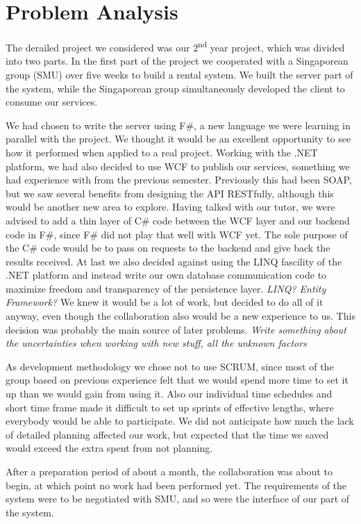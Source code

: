 \section{Problem Analysis}
The derailed project we considered was our 2\textsuperscript{nd} year project, which was divided into two parts. In the first part of the project we cooperated with a Singaporean group (SMU) over five weeks to build a rental system. We built the server part of the system, while the Singaporean group simultaneously developed the client to consume our services.

We had chosen to write the server using F\#, a new language we were learning in parallel with the project. We thought it would be an excellent opportunity to see how it performed when applied to a real project.
Working with the .NET platform, we had also decided to use WCF to publish our services, something we had experience with from the previous semester. Previously this had been SOAP, but we saw several benefits from designing the API RESTfully, although this would be another new area to explore.
Having talked with our tutor, we were advised to add a thin layer of C\# code between the WCF layer and our backend code in F\#, since F\# did not play that well with WCF yet. The sole purpose of the C\# code would be to pass on requests to the backend and give back the results received.
At last we also decided against using the LINQ fascility of the .NET platform and instead write our own database communication code to maximize freedom and transparency of the persistence layer. \textit{LINQ? Entity Framework?}
We knew it would be a lot of work, but decided to do all of it anyway, even though the collaboration also would be a new experience to us. This decision was probably the main source of later problems. \textit{Write something about the uncertainties when working with new stuff, all the unknown factors}

As development methodology we chose not to use SCRUM, since most of the group based on previous experience felt that we would spend more time to set it up than we would gain from using it. Also our individual time schedules and short time frame made it difficult to set up sprints of effective lengths, where everybody would be able to participate. We did not anticipate how much the lack of detailed planning affected our work, but expected that the time we saved would exceed the extra spent from not planning.

After a preparation period of about a month, the collaboration was about to begin, at which point no work had been performed yet. The requirements of the system were to be negotiated with SMU, and so were the interface of our part of the system.

